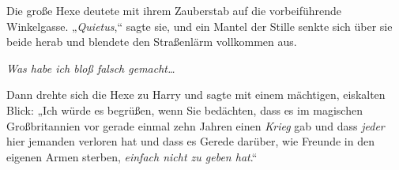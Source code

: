 Die große Hexe deutete mit ihrem Zauberstab auf die vorbeiführende Winkelgasse. „\emph{Quietus},“ sagte sie, und ein Mantel der Stille senkte sich über sie beide herab und blendete den Straßenlärm vollkommen aus.

\emph{Was habe ich bloß falsch gemacht…}

Dann drehte sich die Hexe zu Harry und sagte mit einem mächtigen, eiskalten Blick: „Ich würde es begrüßen, wenn Sie bedächten, dass es im magischen Großbritannien vor gerade einmal zehn Jahren einen \emph{Krieg} gab und dass \emph{jeder} hier jemanden verloren hat und dass es Gerede darüber, wie Freunde in den eigenen Armen sterben, \emph{einfach nicht zu geben hat}.“

